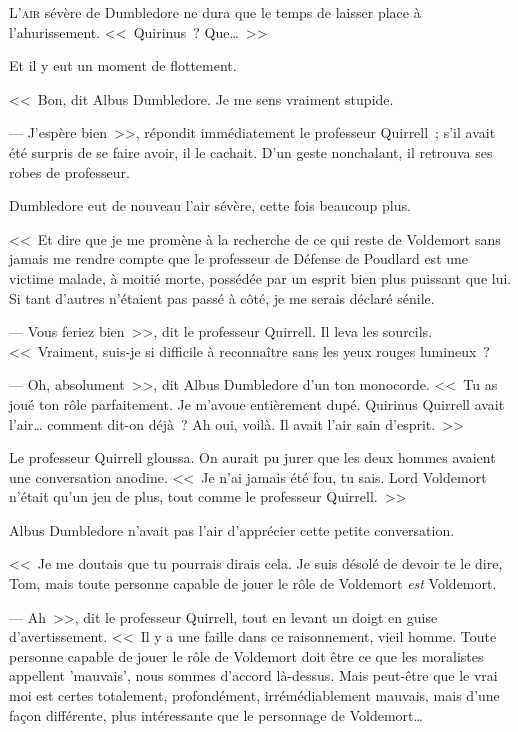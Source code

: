 
\lettrine{L}{'air} sévère de Dumbledore ne dura que le temps de laisser place à l'ahurissement. <<~Quirinus~? Que…~>>

Et il y eut un moment de flottement.

<<~Bon, dit Albus Dumbledore. Je me sens vraiment stupide.

--- J'espère bien~>>, répondit immédiatement le professeur Quirrell~; s'il avait été surpris de se faire avoir, il le cachait. D'un geste nonchalant, il retrouva ses robes de professeur.

Dumbledore eut de nouveau l'air sévère, cette fois beaucoup plus.

<<~Et dire que je me promène à la recherche de ce qui reste de Voldemort sans jamais me rendre compte que le professeur de Défense de Poudlard est une victime malade, à moitié morte, possédée par un esprit bien plus puissant que lui. Si tant d'autres n'étaient pas passé à côté, je me serais déclaré sénile.

--- Vous feriez bien~>>, dit le professeur Quirrell. Il leva les sourcils. <<~Vraiment, suis-je si difficile à reconnaître sans les yeux rouges lumineux~?

--- Oh, absolument~>>, dit Albus Dumbledore d'un ton monocorde. <<~Tu as joué ton rôle parfaitement. Je m'avoue entièrement dupé. Quirinus Quirrell avait l'air… comment dit-on déjà~? Ah oui, voilà. Il avait l'air sain d'esprit.~>>

Le professeur Quirrell gloussa. On aurait pu jurer que les deux hommes avaient une conversation anodine. <<~Je n'ai jamais été fou, tu sais. Lord Voldemort n'était qu'un jeu de plus, tout comme le professeur Quirrell.~>>

Albus Dumbledore n'avait pas l'air d'apprécier cette petite conversation.

<<~Je me doutais que tu pourrais dirais cela. Je suis désolé de devoir te le dire, Tom, mais toute personne capable de jouer le rôle de Voldemort \emph{est} Voldemort.

--- Ah~>>, dit le professeur Quirrell, tout en levant un doigt en guise d'avertissement. <<~Il y a une faille dans ce raisonnement, vieil homme. Toute personne capable de jouer le rôle de Voldemort doit être ce que les moralistes appellent 'mauvais', nous sommes d'accord là-dessus. Mais peut-être que le vrai moi est certes totalement, profondément, irrémédiablement mauvais, mais d'une façon différente, plus intéressante que le personnage de Voldemort…

